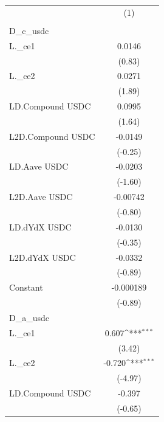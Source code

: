 {
\def\sym#1{\ifmmode^{#1}\else\(^{#1}\)\fi}
\begin{tabular}{l*{1}{c}}
\toprule
                    &\multicolumn{1}{c}{(1)}\\
                    &\multicolumn{1}{c}{} \\
\midrule
D\_c\_usdc            &                     \\
L.\_ce1              &      0.0146         \\
                    &      (0.83)         \\
\addlinespace
L.\_ce2              &      0.0271         \\
                    &      (1.89)         \\
\addlinespace
LD.Compound USDC    &      0.0995         \\
                    &      (1.64)         \\
\addlinespace
L2D.Compound USDC   &     -0.0149         \\
                    &     (-0.25)         \\
\addlinespace
LD.Aave USDC        &     -0.0203         \\
                    &     (-1.60)         \\
\addlinespace
L2D.Aave USDC       &    -0.00742         \\
                    &     (-0.80)         \\
\addlinespace
LD.dYdX USDC        &     -0.0130         \\
                    &     (-0.35)         \\
\addlinespace
L2D.dYdX USDC       &     -0.0332         \\
                    &     (-0.89)         \\
\addlinespace
Constant            &   -0.000189         \\
                    &     (-0.89)         \\
\midrule
D\_a\_usdc            &                     \\
L.\_ce1              &       0.607\sym{***}\\
                    &      (3.42)         \\
\addlinespace
L.\_ce2              &      -0.720\sym{***}\\
                    &     (-4.97)         \\
\addlinespace
LD.Compound USDC    &      -0.397         \\
                    &     (-0.65)         \\

\end{tabular}}
